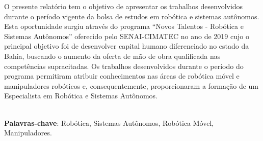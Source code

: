 \begin{thesisresumo}
  
  O presente relatório tem o objetivo de apresentar os trabalhos desenvolvidos durante o período vigente da bolsa de estudos em robótica e sistemas autônomos. Esta oportunidade surgiu através do programa ``Novos Talentos - Robótica e Sistemas Autônomos'' oferecido pelo SENAI-CIMATEC no ano de 2019 cujo o principal objetivo foi de desenvolver capital humano diferenciado no estado da Bahia, buscando o aumento da oferta de mão de obra qualificada nas competências supracitadas. Os trabalhos desenvolvidos durante o período do programa permitiram atribuir conhecimentos nas áreas de robótica móvel e manipuladores robóticos e, consequentemente, proporcionaram a formação de um Especialista em Robótica e Sistemas Autônomos.

\ \\


\textbf{Palavras-chave}: Robótica, Sistemas Autônomos, Robótica Móvel, Manipuladores.

\end{thesisresumo}
